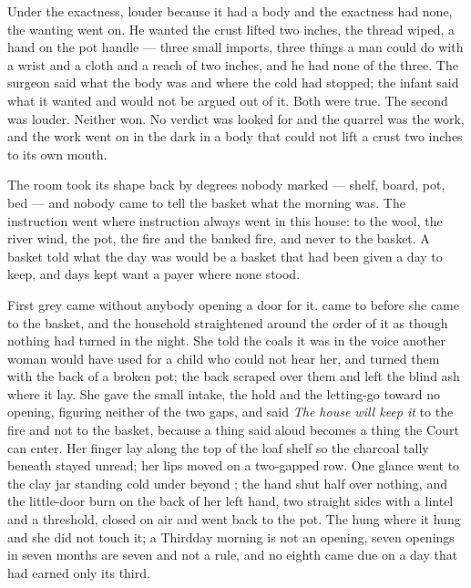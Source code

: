 Under the exactness, louder because it had a body and the exactness had none, the wanting went on. He wanted the crust lifted two inches, the thread wiped, a hand on the pot handle --- three small imports, three things a man could do with a wrist and a cloth and a reach of two inches, and he had none of the three. The surgeon said what the body was and where the cold had stopped; the infant said what it wanted and would not be argued out of it. Both were true. The second was louder. Neither won. No verdict was looked for and the quarrel was the work, and the work went on in the dark in a body that could not lift a crust two inches to its own mouth.

The room took its shape back by degrees nobody marked --- shelf, board, pot, bed --- and nobody came to tell the basket what the morning was. The instruction went where instruction always went in this house: to the wool, the river wind, the pot, the fire and the banked fire, and never to the basket. A basket told what the day was would be a basket that had been given a day to keep, and days kept want a payer where none stood.

\scenebreak

First grey came without anybody opening a door for it.  came to  before she came to the basket, and the household straightened around the order of it as though nothing had turned in the night. She told the coals it was  in the voice another woman would have used for a child who could not hear her, and turned them with the back of a broken pot; the back scraped over them and left the blind ash where it lay. She gave the small intake, the hold and the letting-go toward no opening, figuring neither of the two gaps, and said \emph{The house will keep it} to the fire and not to the basket, because a thing said aloud becomes a thing the Court can enter. Her finger lay along the top of the loaf shelf so the charcoal tally beneath stayed unread; her lips moved on a two-gapped row. One glance went to the clay jar standing cold under  beyond ; the hand shut half over nothing, and the little-door burn on the back of her left hand, two straight sides with a lintel and a threshold, closed on air and went back to the pot. The  hung where it hung and she did not touch it; a Thirdday morning is not an opening, seven openings in seven months are seven and not a rule, and no eighth came due on a day that had earned only its third.

